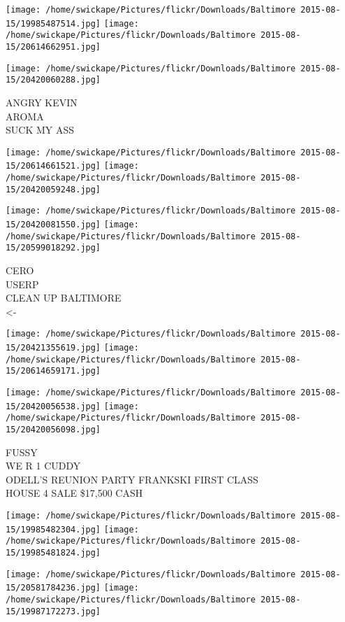 \documentclass[10pt,letterpaper]{article}
\begin{document}
\texttt{[image: /home/swickape/Pictures/flickr/Downloads/Baltimore 2015-08-15/19985487514.jpg]}
\texttt{[image: /home/swickape/Pictures/flickr/Downloads/Baltimore 2015-08-15/20614662951.jpg]}

\vspace{0.25in}
\texttt{[image: /home/swickape/Pictures/flickr/Downloads/Baltimore 2015-08-15/20420060288.jpg]}

ANGRY KEVIN\\
AROMA\\
SUCK MY ASS
\pagebreak

\texttt{[image: /home/swickape/Pictures/flickr/Downloads/Baltimore 2015-08-15/20614661521.jpg]}
\texttt{[image: /home/swickape/Pictures/flickr/Downloads/Baltimore 2015-08-15/20420059248.jpg]}

\texttt{[image: /home/swickape/Pictures/flickr/Downloads/Baltimore 2015-08-15/20420081550.jpg]}
\texttt{[image: /home/swickape/Pictures/flickr/Downloads/Baltimore 2015-08-15/20599018292.jpg]}

CERO\\
USERP\\
CLEAN UP BALTIMORE\\
<{-}
\pagebreak

\texttt{[image: /home/swickape/Pictures/flickr/Downloads/Baltimore 2015-08-15/20421355619.jpg]}
\texttt{[image: /home/swickape/Pictures/flickr/Downloads/Baltimore 2015-08-15/20614659171.jpg]}

\texttt{[image: /home/swickape/Pictures/flickr/Downloads/Baltimore 2015-08-15/20420056538.jpg]}
\texttt{[image: /home/swickape/Pictures/flickr/Downloads/Baltimore 2015-08-15/20420056098.jpg]}

FUSSY\\
WE R 1 CUDDY\\
ODELL'S REUNION PARTY FRANKSKI FIRST CLASS\\
HOUSE 4 SALE \$17,500 CASH
\pagebreak

\texttt{[image: /home/swickape/Pictures/flickr/Downloads/Baltimore 2015-08-15/19985482304.jpg]}
\texttt{[image: /home/swickape/Pictures/flickr/Downloads/Baltimore 2015-08-15/19985481824.jpg]}

\texttt{[image: /home/swickape/Pictures/flickr/Downloads/Baltimore 2015-08-15/20581784236.jpg]}
\texttt{[image: /home/swickape/Pictures/flickr/Downloads/Baltimore 2015-08-15/19987172273.jpg]}
\end{document}
